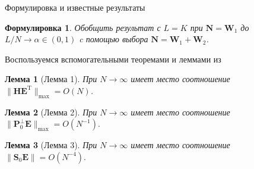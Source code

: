 \documentclass[notheorems, handout]{beamer}
\newtheorem{lemma}{Лемма}
\newtheorem{formulation}{Формулировка}
\begin{document}
		\begin{frame}{Формулировка и известные результаты}
			\begin{formulation}
				Обобщить результат \cite{ZNekrutkin} с $L=K$ при $\mathbf{N}=\mathbf{W}_1$ до $L/N\to \alpha \in (0,1)$ c помощью выбора $\mathbf{N}=\mathbf{W}_1+\mathbf{W}_2$.
			\end{formulation}
			Воспользуемся вспомогательными теоремами и леммами из \cite{ZNekrutkin}
			\begin{lemma}[Лемма 1]\label{lem:2}
				При $N\rightarrow\infty$ имеет место соотношение $\|\mathbf{HE}^\mathrm{T}\|_{\max} = O(N)$.
			\end{lemma}
			\begin{lemma}[Лемма 2]
				При $N\rightarrow\infty$ имеет место соотношение $\|\mathbf{P}_0^{\bot}\mathbf{E}\|_{\max} = O(N^{-1}).$
			\end{lemma}
			\begin{lemma}[Лемма 3]
				При $N\rightarrow\infty$ имеет место соотношение $\|\mathbf{S}_0\mathbf{E}\|=O(N^{-4}).$
			\end{lemma}
	\end{frame}
\end{document}

